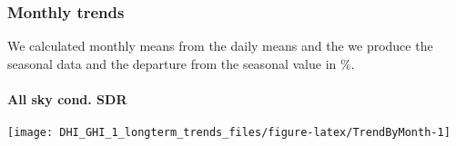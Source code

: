 \documentclass[
  10pt,
  a4paper,oneside]{article}
\begin{document}
\newpage
\FloatBarrier

\hypertarget{monthly-trends}{%
\subsubsection{Monthly trends}\label{monthly-trends}}

We calculated monthly means from the daily means and the we produce the
seasonal data and the departure from the seasonal value in \%.

\newpage

\hypertarget{all-sky-cond.-sdr}{%
\paragraph{All sky cond. SDR}\label{all-sky-cond.-sdr}}

\begin{center}\texttt{[image: DHI\_GHI\_1\_longterm\_trends\_files/figure-latex/TrendByMonth-1]} \end{center}

\scriptsize 
\end{document}

